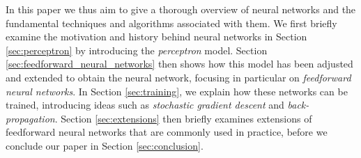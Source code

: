 In this paper we thus aim to give a thorough overview of neural networks and the fundamental techniques and algorithms associated with them. We first briefly examine the motivation and history behind neural networks in Section \ref{sec:perceptron} by introducing the \emph{perceptron} model. Section \ref{sec:feedforward_neural_networks} then shows how this model has been adjusted and extended to obtain the neural network, focusing in particular on \emph{feedforward neural networks}. In Section \ref{sec:training}, we explain how these networks can be trained, introducing ideas such as \emph{stochastic gradient descent} and \emph{back-propagation}. Section \ref{sec:extensions} then briefly examines extensions of feedforward neural networks that are commonly used in practice, before we conclude our paper in Section \ref{sec:conclusion}.